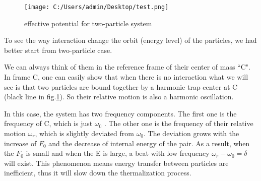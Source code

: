 \documentclass[aps,pre,twocolumn
,groupedaddress]{revtex4-1}
\begin{document}
\begin{figure}[hbtp]
\centering
\texttt{[image: C:/Users/admin/Desktop/test.png]}
\caption{effective potential for two-particle system}
\label{fig:thermalization2}
\end{figure}

To see the way interaction change the orbit (energy level) of the particles, we had better start from two-particle case.

We can always think of them in the reference frame of their center of mass ``C". In frame C, one can easily show that when there is no interaction what we will see is that two particles are bound together by a harmonic trap center at C (black line in fig.\ref{fig:thermalization2}). So their relative motion is also a harmonic oscillation. 

In this case, the system has two frequency components. The first one is the frequency of C, which is just $\omega_0$ . The other one is the frequency of their relative motion $\omega_r$, which is slightly deviated from $\omega_0$. The deviation grows with the increase of $F_0$ and the decrease of internal energy of the pair. As a result, when the $F_0$ is small and when the E is large, a beat with low frequency $\omega_r-\omega_0=\delta$ will exist. This phenomenon means energy transfer between particles are inefficient, thus it will slow down the thermalization process. 
\end{document}
